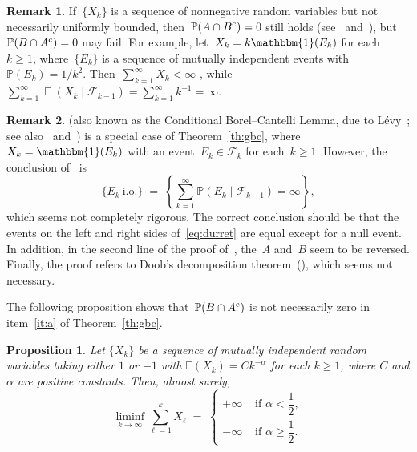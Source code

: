 \documentclass[12pt,a4paper]{article}  %
\newcounter{cite}
\newtheorem{proposition}{Proposition}[section]
\theoremstyle{definition}
\newtheorem{remark}{Remark}[section]
\numberwithin{equation}{section}
\newcommand{\ind}{\mathbbm{1}}
\newcommand{\FF}{\mathcal{F}}
\newcommand{\io}{{\text{i.o.}}\xspace}
\newcommand{\as}{{\text{a.s.}}\xspace}
\newcommand{\comp}{{\textnormal{c}}}
\DeclareMathOperator{\expc}{\mathbb{E}}
\renewcommand{\Pr}{\mathbb{P}}
\begin{document}
\begin{remark}
    \label{rem:nonneg}
    If~$\{X_k\}$ is a sequence of nonnegative random variables but not necessarily uniformly bounded,
    then~$\Pr(A\cap B^\comp) = 0$
    still holds (see~\cite[Proposition~(32)]{Freedman_1973} and~\cite[Theorem~46]{Dellacherie_Meyer_1982}), but~$\Pr(B\cap A^\comp) = 0$ may fail. For example, let~$X_k = k \ind(E_k)$ for
    each~$k\ge 1$, where~$\{E_k\}$ is a sequence of mutually independent events with~$\Pr(E_k)
    = 1/k^2$. Then~$\sum_{k=1}^\infty X_k < \infty$ \as, while~$\sum_{k=1}^\infty
    \expc(X_k\mathrel{|}\FF_{k-1}) = \sum_{k=1}^\infty k^{-1}= \infty$.
\end{remark}


\begin{remark}
    \label{rem:durret}
    \cite[Theorem~4.3.4]{Durrett_2019} (also known as the Conditional Borel–Cantelli
    Lemma, due to L\'{e}vy~\cite[Corollaire~68]{Levy_1937};
    see also~\cite[Theorem~12.15]{Williams_1991} and~\cite[Exercise~11.2.7]{Klenke_2020}) is a special case of Theorem~\ref{th:gbc}, where~$X_k
    = \ind(E_k)$ with an event~$E_k \in \FF_k$ for each~$k\ge 1$.
    However, the conclusion of~\cite[Theorem~4.3.4]{Durrett_2019}
    is
    \begin{equation}
        \label{eq:durret}
        \{E_k~\io\} \;=\; \left\{\sum_{k=1}^\infty \Pr(E_k\mathrel{|}\FF_{k-1})
        = \infty\right\},
    \end{equation}
    which seems not completely rigorous. The correct conclusion should be that the events on the
    left and right sides of~\eqref{eq:durret} are equal except for a null event.
    In addition, in the second line of the proof of~\cite[Theorem~4.3.4]{Durrett_2019},
    the~$A$ and~$B$ seem to be reversed. Finally, the proof refers to Doob's decomposition
    theorem~(\cite[Theorem~4.3.2]{Durrett_2019}), which seems not necessary.
\end{remark}

The following proposition shows that~$\Pr(B\cap A^\comp)$ is not necessarily zero in
item~\ref{it:a} of Theorem~\ref{th:gbc}.
\begin{proposition}
    \label{prop:sum}
    Let $\{X_k\}$ be a sequence of mutually independent random variables taking either $1$ or $-1$ with
$\mathbb{E}(X_k) = Ck^{-\alpha}$ for each $k\ge 1$,
where $C$ and $\alpha$ are positive constants.
Then, almost surely,
\[
\liminf_{k\to \infty} \sum_{\ell=1}^k X_\ell \;=\;
\begin{cases}
+\infty & \text{ if } \alpha < \dfrac{1}{2}, \\[2ex]
-\infty & \text{ if } \alpha \ge \dfrac{1}{2}.
\end{cases}
\]
\end{proposition}
\end{document}
